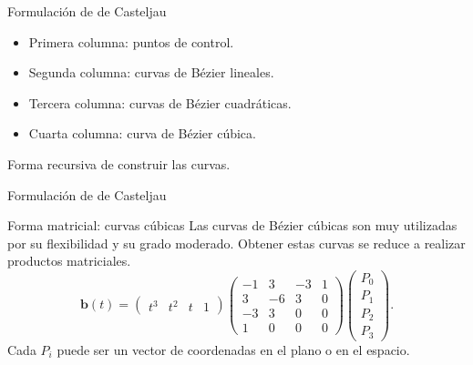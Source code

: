 \documentclass[main.tex]{subfiles}
\begin{document}
\begin{frame}[t]{Formulación de de Casteljau}
\begin{minipage}[t]{\textwidth}\begin{center}\end{center}\end{minipage}\small\begin{itemize}
\item Primera columna: puntos de control.
\item Segunda columna: curvas de Bézier lineales.
\item Tercera columna: curvas de Bézier cuadráticas.
\item Cuarta columna: curva de Bézier cúbica.
\end{itemize}Forma recursiva de construir las curvas.
\end{frame}

\begin{frame}[t]{Formulación de de Casteljau}
\end{frame}

\begin{frame}[t]{Forma matricial: curvas cúbicas}
\small Las curvas de Bézier cúbicas son muy utilizadas por su flexibilidad y su grado moderado. Obtener estas curvas se reduce a realizar productos matriciales.\[\mathbf b(t)=\begin{pmatrix}t^3&t^2&t&1\end{pmatrix}\begin{pmatrix}-1&3&-3&1\\3&-6&3&0\\-3&3&0&0\\1&0&0&0\end{pmatrix}\begin{pmatrix}P_0\\P_1\\P_2\\P_3\end{pmatrix}.\]\medskip Cada $P_i$ puede ser un vector de coordenadas en el plano o en el espacio.
\end{frame}
\end{document}

